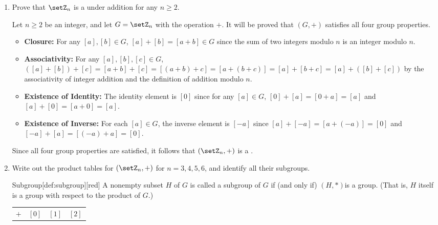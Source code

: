 \begin{enumerate}
\begin{enumerate}
\begin{subprove}
      Hence, \(a b \equiv a' b' \pmod{n}\), and therefore \([a b] = [a' b']\).
      By , multiplication on \(\setZ_{n}\) is well-defined.
    \end{subprove}
  \end{enumerate}
  \item Prove that \(\setZ_{n}\) is a  under addition for any \(n \geq 2\).
  \begin{subprove}
    Let \(n \geq 2\) be an integer, and let \(G = \setZ_{n}\) with the operation \(+\).
    It will be proved that \((G, +)\) satisfies all four group properties.
    \begin{itemize}
      \item \textbf{Closure:} For any \([a], [b] \in G\), \([a] + [b] = [a + b] \in G\) since the sum of two integers modulo \(n\) is an integer modulo \(n\).
      \item \textbf{Associativity:} For any \([a], [b], [c] \in G\), \(([a] + [b]) + [c] = [a + b] + [c] = [(a + b) + c] = [a + (b + c)] = [a] + [b + c] = [a] + ([b] + [c])\) by the associativity of integer addition and the definition of addition modulo \(n\).
      \item \textbf{Existence of Identity:} The identity element is \([0]\) since for any \([a] \in G\), \([0] + [a] = [0 + a] = [a]\) and \([a] + [0] = [a + 0] = [a]\).
      \item \textbf{Existence of Inverse:} For each \([a] \in G\), the inverse element is \([-a]\) since \([a] + [-a] = [a + (-a)] = [0]\) and \([-a] + [a] = [(-a) + a] = [0]\).
    \end{itemize}
    Since all four group properties are satisfied, it follows that \((\setZ_{n}, +)\) is a .
  \end{subprove}
  \item Write out the product tables for \((\setZ_{n}, +)\) for \(n = 3, 4, 5, 6\), and identify all their subgroups.
  \begin{define}{Subgroup}[def:subgroup][red]
    A nonempty subset $H$ of $G$ is called a subgroup of $G$ if (and only if) $(H, *)$is a group. (That is, $H$ itself is a group with respect to the product of $G$.)
  \end{define}
  \begin{subprove}
    \begin{center}
    \begin{tabular}{|c|c|c|c|}
    \hline
    \(+\) & \([0]\) & \([1]\) & \([2]\) \\

\end{tabular}
\end{center}
\end{subprove}
\end{enumerate}

